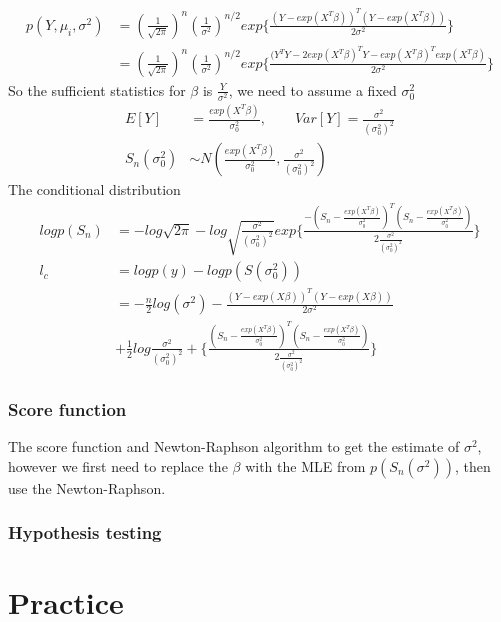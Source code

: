 \documentclass[11pt]{article} %
\begin{document}
\begin{align*}
	p{(Y, \mu_i, \sigma^2)} &= \left( \frac{1}{\sqrt{2\pi}} \right)^n \left( \frac{1}{\sigma^2}\right)^{n/2} exp\{ \frac{(Y- exp(X^T \beta))^T (Y- exp(X^T \beta))}{2 \sigma^2} \}\\
	&= \left( \frac{1}{\sqrt{2\pi}} \right)^n \left( \frac{1}{\sigma^2}\right)^{n/2} exp\{ \frac{(Y^T Y - 2 exp(X^T \beta)^T Y - exp(X^T \beta)^T exp(X^T \beta)}{2 \sigma^2} \}
\end{align*}
So the sufficient statistics for $\beta$ is $\frac{Y}{\sigma^2}$, we need to assume a fixed $\sigma_0^2$
\begin{align*}
	E[Y] &= \frac{exp(X^T \beta)}{\sigma_0^2}, \qquad Var[Y] = \frac{\sigma^2}{(\sigma_0^2)^2} \\
	S_n(\sigma_0^2) & \sim N(\frac{exp(X^T \beta)}{\sigma_0^2}, \frac{\sigma^2}{(\sigma_0^2)^2} )
\end{align*}
The conditional distribution
\begin{align*}
	log p(S_n) &=-log {\sqrt{2\pi}} - log{\sqrt{\frac{\sigma^2}{(\sigma_0^2)^2}}} exp\{\frac{-(S_n - \frac{exp(X^T \beta)}{\sigma_0^2})^T (S_n - \frac{exp(X^T \beta)}{\sigma_0^2})}{2 \frac{\sigma^2}{(\sigma_0^2)^2}} \} \\
	l_c &= log p(y) - log p(S(\sigma_0^2))\\
	&= -\frac{n}{2} log(\sigma^2) - \frac{(Y- exp(X \beta))^T(Y- exp(X \beta))}{2 \sigma^2} \\
	& + \frac{1}{2} log{\frac{\sigma^2}{(\sigma_0^2)^2}} + \{\frac{(S_n - \frac{exp(X^T \beta)}{\sigma_0^2})^T (S_n - \frac{exp(X^T \beta)}{\sigma_0^2})}{2 \frac{\sigma^2}{(\sigma_0^2)^2}} \} 
\end{align*}

\subsubsection{Score function}
The score function and Newton-Raphson algorithm to get the estimate of $\sigma^2$, however we first need to replace the $\beta$ with the MLE from $p(S_n(\sigma^2))$, then use the Newton-Raphson. 

\subsubsection{Hypothesis testing}


\section{Practice}
  
\end{document}
